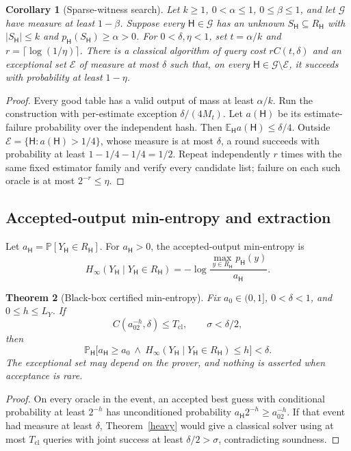 \documentclass[11pt]{article}
\newtheorem{theorem}{Theorem}[section]
\newtheorem{corollary}[theorem]{Corollary}
\theoremstyle{definition}\newtheorem{definition}[theorem]{Definition}
\theoremstyle{remark}\newtheorem{remark}[theorem]{Remark}
\newcommand{\E}{\mathbb E}\newcommand{\Prb}{\mathbb P}
\newcommand{\mc}{\mathcal}\newcommand{\eps}{\varepsilon}
\begin{document}
\begin{corollary}[Sparse-witness search]
Let \(k\ge1\), \(0<\alpha\le1\), \(0\le\beta\le1\), and let \(\mc G\) have measure at least \(1-\beta\). Suppose every \(\mathsf H\in\mc G\) has an unknown \(S_{\mathsf H}\subseteq R_{\mathsf H}\) with \(|S_{\mathsf H}|\le k\) and \(p_{\mathsf H}(S_{\mathsf H})\ge\alpha>0\). For \(0<\delta,\eta<1\), set \(t=\alpha/k\) and \(r=\lceil\log(1/\eta)\rceil\). There is a classical algorithm of query cost \(rC(t,\delta)\) and an exceptional set \(\mc E\) of measure at most \(\delta\) such that, on every \(\mathsf H\in\mc G\setminus\mc E\), it succeeds with probability at least \(1-\eta\).
\end{corollary}
\begin{proof}
Every good table has a valid output of mass at least \(\alpha/k\). Run the construction with per-estimate exception \(\delta/(4M_t)\). Let \(a(\mathsf H)\) be its estimate-failure probability over the independent hash. Then \(\E_{\mathsf H}a(\mathsf H)\le\delta/4\). Outside \(\mc E=\{\mathsf H:a(\mathsf H)>1/4\}\), whose measure is at most \(\delta\), a round succeeds with probability at least \(1-1/4-1/4=1/2\). Repeat independently \(r\) times with the same fixed estimator family and verify every candidate list; failure on each such oracle is at most \(2^{-r}\le\eta\).
\end{proof}

\subsection{Accepted-output min-entropy and extraction}
Let \(a_{\mathsf H}=\Prb[Y_{\mathsf H}\in R_{\mathsf H}]\). For \(a_{\mathsf H}>0\), the accepted-output min-entropy is
\[
 H_\infty(Y_{\mathsf H}\mid Y_{\mathsf H}\in R_{\mathsf H})=-\log\frac{\max_{y\in R_{\mathsf H}}p_{\mathsf H}(y)}{a_{\mathsf H}}.
\]

\begin{theorem}[Black-box certified min-entropy]\label{thm:entropy}
Fix \(a_0\in(0,1]\), \(0<\delta<1\), and \(0\le h\le L_Y\). If
\[
 C(a_02^{-h},\delta)\le T_{\mathrm{cl}},\qquad\sigma<\delta/2,
\]
then
\[
 \Prb_{\mathsf H}\bigl[a_{\mathsf H}\ge a_0\ \wedge\ H_\infty(Y_{\mathsf H}\mid Y_{\mathsf H}\in R_{\mathsf H})\le h\bigr]<\delta.
\]
The exceptional set may depend on the prover, and nothing is asserted when acceptance is rare.
\end{theorem}
\begin{proof}
On every oracle in the event, an accepted best guess with conditional probability at least \(2^{-h}\) has unconditioned probability \(a_{\mathsf H}2^{-h}\ge a_02^{-h}\). If that event had measure at least \(\delta\), Theorem~\ref{heavy} would give a classical solver using at most \(T_{\mathrm{cl}}\) queries with joint success at least \(\delta/2>\sigma\), contradicting soundness.
\end{proof}
\end{document}
